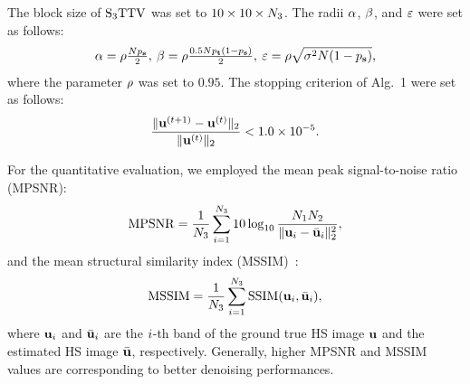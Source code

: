\documentclass[10pt,journal]{IEEEtran}
\begin{document}
\begin{itemize}
\end{itemize}

The block size of ${\text{S}_{3} \text{TTV}}$ was set to $10 \times 10 \times N_{3}$.
The radii $\alpha$, $\beta$, and $\varepsilon$ were set as follows:
\begin{equation}
    \label{eq:RadiusSet}
    \alpha = \rho \tfrac{N p_{\mathbf{s}}}{2}, \:
    \beta = \rho \tfrac{0.5 N p_{\mathbf{t}} (1 - p_{\mathbf{s}})}{2}, \: \varepsilon = \rho \sqrt{\sigma^2 N (1 - p_{\mathbf{s}})},
\end{equation}
where the parameter $\rho$ was set to $0.95$.
The stopping criterion of Alg.~1 were set as follows:
\begin{equation}
    \label{eq:StopCri_simulated}
    \frac{\| \mathbf{u}^{(t+1)} - \mathbf{u}^{(t)} \|_2}{\| \mathbf{u}^{(t)}\|_{2}} < 1.0 \times 10^{-5}.
\end{equation}

For the quantitative evaluation, we employed the mean peak signal-to-noise ratio (MPSNR):
\begin{equation}
    \label{eq:MPSNR}
    \mathrm{MPSNR} = \frac{1}{N_{3}} \sum_{i=1}^{N_{3}} 10\log_{10}\frac{N_{1} N_{2}}{\|\mathbf{u}_{i} - \bar{\mathbf{u}}_{i}\|_{2}^{2}},
\end{equation}
and the mean structural similarity index (MSSIM)~\cite{Wang2004SSIM}:
\begin{equation}
    \label{eq:MSSIM}
    \mathrm{MSSIM} = \frac{1}{N_{3}} \sum_{i=1}^{N_{3}} \mathrm{SSIM}(\mathbf{u}_{i}, \bar{\mathbf{u}}_{i}),
\end{equation}
where $\mathbf{u}_{i}$ and $\bar{\mathbf{u}}_{i}$ are the $i$-th band of the ground true HS image $\mathbf{u}$ and the estimated HS image $\bar{\mathbf{u}}$, respectively.
Generally, higher MPSNR and MSSIM values are corresponding to better denoising performances.
\end{document}
